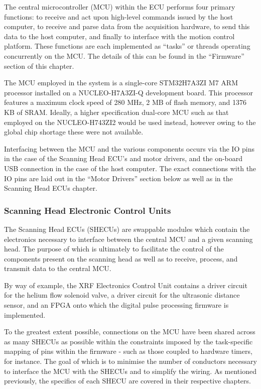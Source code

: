 The central microcontroller (MCU) within the ECU performs four primary functions: to receive and act upon high-level commands issued by the host computer, to receive and parse data from the acquisition hardware, to send this data to the host computer, and finally to interface with the motion control platform. These functions are each implemented as “tasks” or threads operating concurrently on the MCU. The details of this can be found in the “Firmware” section of this chapter.

The MCU employed in the system is a single-core STM32H7A3ZI M7 ARM processor installed on a NUCLEO-H7A3ZI-Q development board. This processor features a maximum clock speed of 280 MHz, 2 MB of flash memory, and 1376 KB of SRAM. Ideally, a higher specification dual-core MCU such as that employed on the NUCLEO-H743ZI2 would be used instead, however owing to the global chip shortage these were not available.

Interfacing between the MCU and the various components occurs via the IO pins in the case of the Scanning Head ECU’s and motor drivers, and the on-board USB connection in the case of the host computer. The exact connections with the IO pins are laid out in the “Motor Drivers” section below as well as in the Scanning Head ECUs chapter.


\subsubsection{Scanning Head Electronic Control Units}

The Scanning Head ECUs (SHECUs) are swappable modules which contain the electronics necessary to interface between the central MCU and a given scanning head. The purpose of which is ultimately to facilitate the control of the components present on the scanning head as well as to receive, process, and transmit data to the central MCU.

By way of example, the XRF Electronics Control Unit contains a driver circuit for the helium flow solenoid valve, a driver circuit for the ultrasonic distance sensor, and an FPGA onto which the digital pulse processing firmware is implemented.

To the greatest extent possible, connections on the MCU have been shared across as many SHECUs as possible within the constraints imposed by the task-specific mapping of pins within the firmware - such as those coupled to hardware timers, for instance. The goal of which is to minimise the number of conductors necessary to interface the MCU with the SHECUs and to simplify the wiring.
As mentioned previously, the specifics of each SHECU are covered in their respective chapters.


